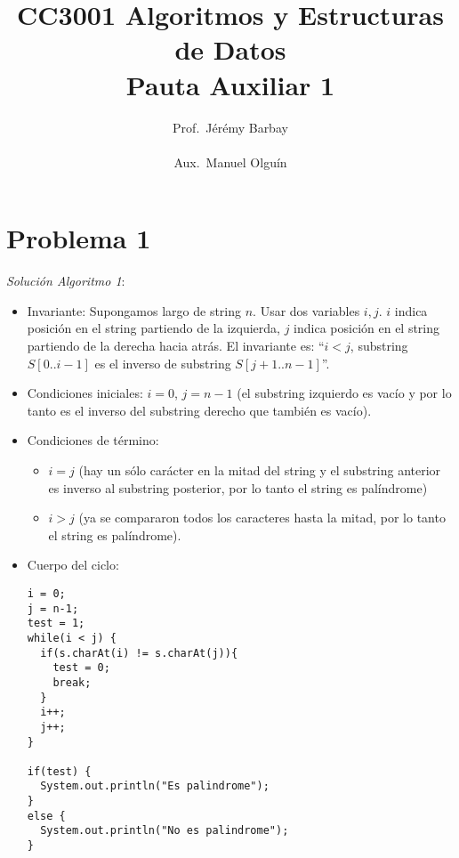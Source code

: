\documentclass[11pt,spanish]{article}
\begin{document}

\title{\vspace*{-3cm}CC3001 Algoritmos y Estructuras de Datos
\\Pauta Auxiliar 1
}
\author{
Prof.\ Jérémy Barbay\\
\\Aux.\ Manuel Olguín
}

\date{}
\maketitle

\thispagestyle{empty}

\section*{Problema 1}

\emph{Solución Algoritmo 1}:

\begin{itemize}
 \item Invariante: Supongamos largo de string $n$. Usar dos variables $i,j$. $i$ indica posición en el string partiendo de la izquierda, $j$ indica posición en el string partiendo de la derecha hacia atrás. El invariante es: ``$i < j$, substring $S[0..i-1]$ es el inverso de substring $S[j+1..n-1]$''.

\item Condiciones iniciales: $i=0$, $j=n-1$ (el substring izquierdo es vacío y por lo tanto es el inverso del substring derecho que también es vacío).

\item Condiciones de término: 
  \begin{itemize}
    \item $i=j$ (hay un sólo carácter en la mitad del string y el substring anterior es inverso al substring posterior, por lo tanto el string es palíndrome)
    \item $i > j$ (ya se compararon todos los caracteres hasta la mitad, por lo tanto el string es palíndrome).
  \end{itemize}
\newpage
\item Cuerpo del ciclo:

\begin{verbatim}
i = 0;
j = n-1;
test = 1;
while(i < j) {
  if(s.charAt(i) != s.charAt(j)){
    test = 0;
    break;
  }
  i++;
  j++;
}

if(test) {
  System.out.println("Es palindrome");
}
else {
  System.out.println("No es palindrome");
}
\end{verbatim}


\end{itemize}
\end{document}
